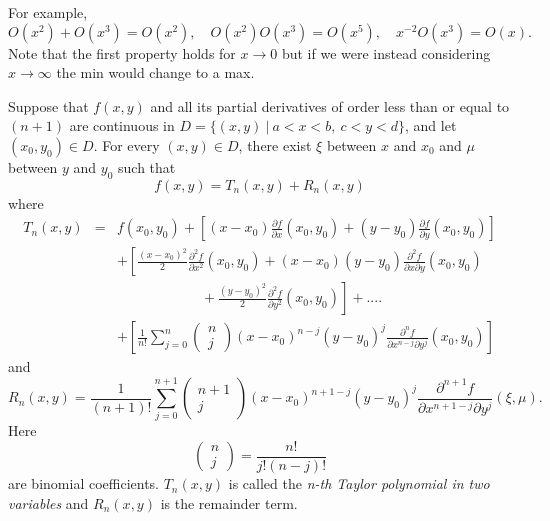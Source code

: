 \noindent
For example,
\[
O(x^2)+O(x^3)=O(x^2), \quad
O(x^2)O(x^3)=O(x^5), \quad
x^{-2}O(x^3)=O(x).
\]
Note that the first property holds for $x\to 0$ but if we were instead considering
$x\to\infty$ the min would change to a max.

\pagebreak[2]

\begin{theorem}
Suppose that $f(x, y)$ and all its partial derivatives of order less
than or equal to $(n+1)$ are continuous in
$D=\{ (x, y) \ \vert \ a< x< b, \ c< y< d \}$, and let $(x_{0}, y_{0})\in D$.
For every $(x, y)\in D$, there exist $\xi$ between $x$ and $x_{0}$ and $\mu$
between $y$ and $y_{0}$ such that
$$
f(x, y)=T_{n}(x, y)+R_{n}(x, y)
$$
where
\begin{eqnarray}
T_{n}(x, y) &=& f(x_{0}, y_{0})+
\left[(x-x_{0})\frac{\partial f}{\partial x}(x_{0}, y_{0})+
(y-y_{0})\frac{\partial f}{\partial y}(x_{0}, y_{0})\right] \nonumber \\
&& + \left[\frac{(x-x_{0})^{2}}{2}\frac{\partial^{2} f}{\partial x^{2}}(x_{0}, y_{0})+
(x-x_{0})(y-y_{0})\frac{\partial^{2} f}{\partial x\partial y}(x_{0}, y_{0})\right.\\
&&\qquad\qquad\qquad+\left.
\frac{(y-y_{0})^{2}}{2}\frac{\partial^{2} f}{\partial y^{2}}(x_{0}, y_{0})
\right] + .... \nonumber \\
&& + \left[\frac{1}{n!}\sum_{j=0}^{n}
\left(
\begin{array}{c}
n \\
 j
\end{array}
\right)
(x-x_{0})^{n-j}(y-y_{0})^{j}
\frac{\partial^{n} f}{\partial x^{n-j}\partial y^{j}}(x_{0}, y_{0})\right] \nonumber
\end{eqnarray}
and
\[
R_{n}(x, y)=
\frac{1}{(n+1)!}\sum_{j=0}^{n+1}
\left(
\begin{array}{c}
n+1 \\
 j
\end{array}
\right)
(x-x_{0})^{n+1-j}(y-y_{0})^{j}
\frac{\partial^{n+1} f}{\partial x^{n+1-j}\partial y^{j}}(\xi, \mu) .
\]
Here
\[
\left(
\begin{array}{c}
n \\
 j
\end{array}
\right)=\frac{n!}{j!(n-j)!}
\]
are binomial coefficients.
$T_{n}(x, y)$ is called the {\it n-th Taylor polynomial in
two variables} and $R_{n}(x, y)$ is the remainder term.
\end{theorem}
